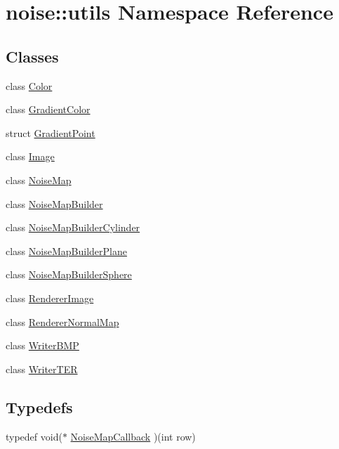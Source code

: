 \hypertarget{namespacenoise_1_1utils}{\section{noise\+:\+:utils Namespace Reference}
\label{namespacenoise_1_1utils}
}
\subsection*{Classes}
\begin{DoxyCompactItemize}
\item 
class \hyperlink{classnoise_1_1utils_1_1_color}{Color}
\item 
class \hyperlink{classnoise_1_1utils_1_1_gradient_color}{Gradient\+Color}
\item 
struct \hyperlink{structnoise_1_1utils_1_1_gradient_point}{Gradient\+Point}
\item 
class \hyperlink{classnoise_1_1utils_1_1_image}{Image}
\item 
class \hyperlink{classnoise_1_1utils_1_1_noise_map}{Noise\+Map}
\item 
class \hyperlink{classnoise_1_1utils_1_1_noise_map_builder}{Noise\+Map\+Builder}
\item 
class \hyperlink{classnoise_1_1utils_1_1_noise_map_builder_cylinder}{Noise\+Map\+Builder\+Cylinder}
\item 
class \hyperlink{classnoise_1_1utils_1_1_noise_map_builder_plane}{Noise\+Map\+Builder\+Plane}
\item 
class \hyperlink{classnoise_1_1utils_1_1_noise_map_builder_sphere}{Noise\+Map\+Builder\+Sphere}
\item 
class \hyperlink{classnoise_1_1utils_1_1_renderer_image}{Renderer\+Image}
\item 
class \hyperlink{classnoise_1_1utils_1_1_renderer_normal_map}{Renderer\+Normal\+Map}
\item 
class \hyperlink{classnoise_1_1utils_1_1_writer_b_m_p}{Writer\+B\+M\+P}
\item 
class \hyperlink{classnoise_1_1utils_1_1_writer_t_e_r}{Writer\+T\+E\+R}
\end{DoxyCompactItemize}
\subsection*{Typedefs}
\begin{DoxyCompactItemize}
\item 
typedef void($\ast$ \hyperlink{namespacenoise_1_1utils_af10741a3394fadf8798a8f40b753b208}{Noise\+Map\+Callback} )(int row)
\end{DoxyCompactItemize}
